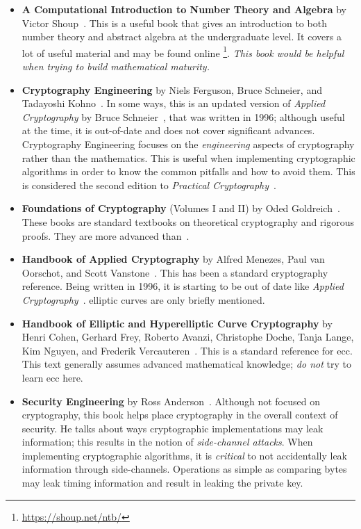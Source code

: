 \begin{itemize}
\item \textbf{A Computational Introduction to Number Theory and Algebra}
    by Victor Shoup~\cite{ComputationalIntroNTA}.
    This is a useful book that gives an introduction to both
    \gls{number theory} and abstract algebra at the undergraduate level.
    It covers a lot of useful material and may be found online%
    \footnote{\url{https://shoup.net/ntb/}}.
    \emph{This book would be helpful when trying to build
    mathematical maturity.}
\item \textbf{Cryptography Engineering}
    by Niels Ferguson, Bruce Schneier, and Tadayoshi Koh\-no~\cite{CryptoEng}.
    In some ways, this is an updated version of \emph{Applied Cryptography}
    by Bruce Schneier~\cite{AppliedCrypto},
    that was written in 1996;
    although useful at the time, it is out-of-date and does not cover
    significant advances.
    Cryptography Engineering focuses on the \emph{engineering}
    aspects of cryptography rather than the mathematics.
    This is useful when implementing cryptographic algorithms in order
    to know the common pitfalls and how to avoid them.
    This is considered the second edition to
    \emph{Practical Cryptography}~\cite{PracticalCryptography}.
\item \textbf{Foundations of Cryptography} (Volumes I and II)
    by Oded Goldreich~\cite{FoundationsCrypto1,FoundationsCrypto2}.
    These books are standard textbooks on theoretical cryptography
    and rigorous proofs.
    They are more advanced than~\cite{IntroModernCrypto}.
\item \textbf{Handbook of Applied Cryptography}
    by Alfred Menezes, Paul van Oorschot,
    and Scott Vanstone~\cite{HandbookAppliedCrypto}.
    This has been a standard cryptography reference.
    Being written in 1996, it is starting to be out of date
    like \emph{Applied Cryptography}~\cite{AppliedCrypto}.
    \Glspl{elliptic curve} are only briefly mentioned.
\item \textbf{Handbook of Elliptic and Hyperelliptic Curve Cryptography}
    by Henri Cohen, Gerhard Frey, Roberto Avanzi, Christophe Doche,
    Tanja Lange, Kim Nguyen, and Frederik Vercauteren~\cite{HandbookECC}.
    This is a standard reference for \gls{ecc}.
    This text generally assumes advanced mathematical knowledge;
    \emph{do not} try to learn \gls{ecc} here.
\item \textbf{Security Engineering} by Ross Anderson~\cite{SecurityEng}.
    Although not focused on cryptography,
    this book helps place cryptography in the overall context of security.
    He talks about ways cryptographic implementations may leak information;
    this results in the notion of \emph{side-channel attacks}.
    When implementing cryptographic algorithms,
    it is \emph{critical} to not accidentally leak information
    through side-channels.
    Operations as simple as comparing bytes may leak timing information
    and result in leaking the private key.
\end{itemize}

